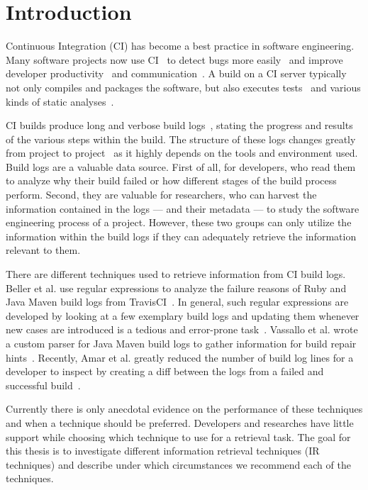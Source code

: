 \documentclass[\myrootdir/main.tex]{subfiles}
\begin{document}
\chapter{Introduction}
Continuous Integration (CI) has become a best practice in software engineering.
Many software projects now use CI~\cite{hilton2016usage,staahl2014modeling,beller2017oops} to detect bugs more easily~\cite{vasilescu2015quality,duvall2007continuous} and improve developer productivity~\cite{miller2008hundred,hilton2016usage} and communication~\cite{downs2012ambient}.
A build on a CI server typically not only compiles and packages the software, but also executes tests~\cite{beller2017oops} and various kinds of static analyses~\cite{zampetti2017open}.

CI builds produce long and verbose build logs~\cite{beller2017oops}, stating the progress and results of the various steps within the build.
The structure of these logs changes greatly from project to project~\cite{staahl2014modeling} as it highly depends on the tools and environment used.
Build logs are a valuable data source. First of all, for developers, who read them to analyze why their build failed or how different stages of the build process perform.
Second, they are valuable for researchers, who can harvest the information contained in the logs --- and their metadata --- to study the software engineering process of a project.
However, these two groups can only utilize the information within the build logs if they can adequately retrieve the information relevant to them.

There are different techniques used to retrieve information from CI build logs. Beller et al. use regular expressions to analyze the failure reasons of Ruby and Java Maven build logs from TravisCI~\cite{beller2017oops}.
In general, such regular expressions are developed by looking at a few exemplary build logs and updating them whenever new cases are introduced is a tedious and error-prone task~\cite{michael2019regexes}.
Vassallo et al. wrote a custom parser for Java Maven build logs to gather information for build repair hints~\cite{vassallo2018un-break}.
Recently, Amar et al. greatly reduced the number of build log lines for a developer to inspect by creating a diff between the logs from a failed and successful build~\cite{amar2019mining}.

Currently there is only anecdotal evidence on the performance of these techniques and when a technique should be preferred.
Developers and researches have little support while choosing which technique to use for a retrieval task.
The goal for this thesis is to investigate different information retrieval techniques (IR techniques) and describe under which circumstances we recommend each of the techniques.
\end{document}
